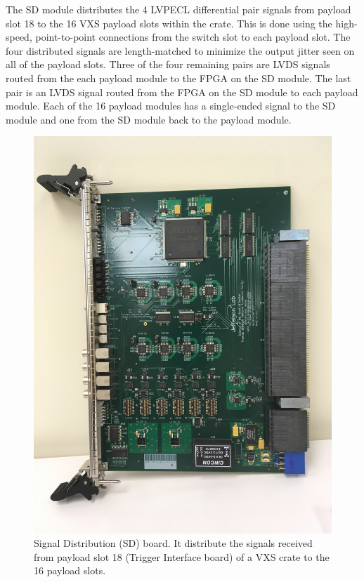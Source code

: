 The SD module distributes the 4 LVPECL differential pair  signals from payload slot 18 to the 16 VXS payload slots within
the crate. This is done using the high-speed, point-to-point connections from the switch slot to each payload slot. The
four distributed signals are length-matched to minimize the output jitter seen on all of the payload slots. Three of the
four remaining pairs are LVDS signals routed from the each payload module to the FPGA on the SD module. The last pair
is an LVDS signal routed from the FPGA on the SD module to each payload module. Each of the 16 payload modules has a
single-ended signal to the SD module and one from the SD module back to the payload module.

\begin{figure}[hbt]
	\centering
	\includegraphics[width=1.0\columnwidth,keepaspectratio]{img/sd_board.jpg}
	\caption{Signal Distribution (SD) board. It distribute the signals received from payload slot 18 (Trigger Interface
          board) of a VXS crate to the 16 payload slots.}
	\label{fig:SDpic}
\end{figure}

